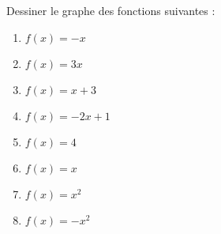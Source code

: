 
\begin{exercice}\label{exoSeconde-0060}

    Dessiner le graphe des fonctions suivantes :
    \begin{multicols}{2}
        \begin{enumerate}
            \item
                \( f(x)=-x\)
            \item
                \( f(x)=3x\)
            \item
                \( f(x)=x+3\)
            \item
                \( f(x)=-2x+1\)
            \item
                \( f(x)=4\)
            \item
                \( f(x)=x\)
            \item
                \( f(x)=x^2\)
            \item
                \( f(x)=-x^2\)
        \end{enumerate}
    \end{multicols}

\end{exercice}
